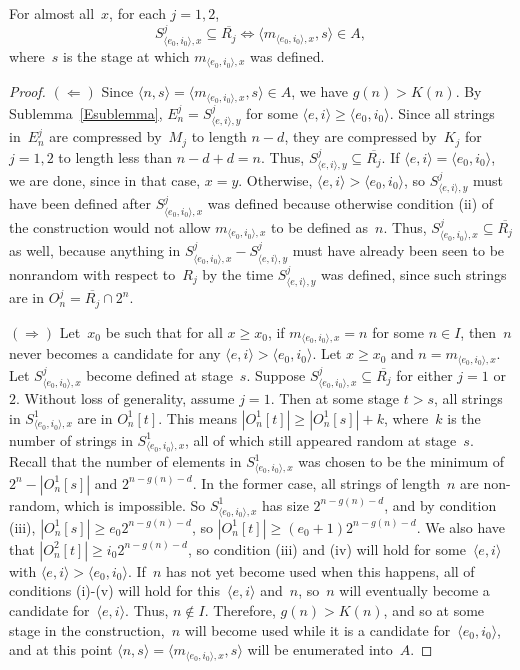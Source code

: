 \documentclass{LMCS}
\newcommand{\0}{\mathbf{0}}
\newcommand{\ov}{\overline}
\newcommand{\RKUj}{R_j}
\newcommand{\KUj}{K_j}
\newcommand{\ei}{{\langle e,i\rangle}}
\newcommand{\eizero}{{\langle e_0,i_0\rangle}}
\newcommand{\ns}{{\langle n,s\rangle}}
\newcommand{\meizerox}{{m_{\eizero,x}}}
\newcommand{\<}{\langle}
\renewcommand{\>}{\rangle}
\begin{document}
\begin{slem}\label{containment}
For almost all~$x$, for each $j=1,2$,
$$
S^j_{\eizero,x}\subseteq \overline{\RKUj}\iff
    \langle \meizerox, s\rangle \in A,
$$
where~$s$ is the stage at which $\meizerox$ was defined.
\end{slem}

\begin{proof}
$(\Leftarrow)$ Since $\langle n,s\rangle=\langle \meizerox, s\rangle \in A$,
we have $g(n)>K(n)$.  By  Sublemma~\ref{Esublemma}, $E^j_n=S^j_{\ei,y}$ for
some $\ei\geq \eizero$.   Since all strings in~$E^j_n$ are compressed
by~$M_j$ to length $n-d$, they are compressed by~$\KUj$ for $j=1, 2$ to
length less than $n-d+d=n$.    Thus, $S^j_{\ei,y}\subseteq \overline{\RKUj}$.
If $\ei=\eizero$, we are done, since in that case, $x=y$.  Otherwise, $\ei>
\eizero$, so $S^j_{\ei,y}$ must have been defined after $S^j_{\eizero, x}$
was defined because otherwise condition (ii) of the construction would not
allow $\meizerox$ to be defined as~$n$.
Thus, $S^j_{\eizero, x}\subseteq \overline{\RKUj}$ as well, because anything
in $S^j_{\eizero, x}-S^j_{\ei,y}$ must have already been seen to be nonrandom
with respect to~$R_j$ by the time $S^j_{\ei,y}$ was defined, since such
strings are in $O^j_n=\ov{R_j}\cap 2^n$.

$(\Rightarrow)$ Let~$x_0$ be such that for all $x\geq x_0$, if $\meizerox=n$
for some $n\in I$, then~$n$ never becomes a candidate for any $\ei>\eizero$.
Let $x\geq x_0$ and $n=\meizerox$. Let $S^j_{\eizero,x}$ become defined at
stage~$s$. Suppose $S^j_{\eizero,x}\subseteq\overline{\RKUj}$ for either
$j=1$ or~$2$. Without loss of generality, assume $j=1$.
Then at some stage $t>s$, all strings in $S^1_{\eizero,x}$ are in $O^1_n[t]$.
This means $|O^1_n[t]|\geq |O^1_n[s]|+k$, where~$k$ is the number of strings
in $S^1_{\eizero,x}$, all of which still appeared random at stage~$s$. Recall
that the number of elements in $S^1_{\eizero,x}$ was chosen to be the minimum
of $2^n-|O^1_n[s]|$ and $2^{n-g(n)-d}$. In the former case, all strings of
length~$n$ are non-random, which is impossible. So $S^1_{\eizero,x}$ has size
$2^{n-g(n)-d}$, and by condition (iii), $|O^1_n[s]|\geq {e_0}2^{n-g(n)-d}$,
so $|O^1_n[t]|\geq (e_0+1)2^{n-g(n)-d}$. We also have that $|O^2_n[t]|\geq
{i_0}2^{n-g(n)-d}$, so condition (iii) and (iv) will hold for some~$\ei$ with
$\ei>\eizero$. If~$n$ has not yet become used when this happens, all of
conditions (i)-(v) will hold for this~$\ei$ and~$n$, so~$n$ will eventually
become a candidate for~$\ei$. Thus, $n\notin I$. Therefore, $g(n)>K(n)$, and
so at some stage in the construction,~$n$ will become used while it is a
candidate for~$\eizero$, and at this point $\ns=\langle \meizerox, s\rangle$
will be enumerated into~$A$.
\end{proof}
\end{document}
